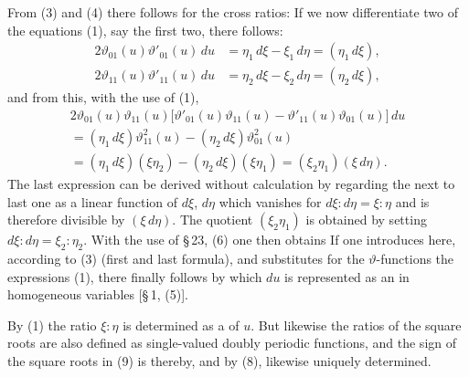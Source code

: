 
From (3) and (4) there follows for the cross ratios:
If we now differentiate two of the equations (1), say the first
two, there follows:
\[
\begin{aligned}
2\vartheta_{01}(u)\vartheta'_{01}(u)\,du &= \eta_1\,d\xi - \xi_1\,d\eta = (\eta_1\,d\xi),\\
2\vartheta_{11}(u)\vartheta'_{11}(u)\,du &= \eta_2\,d\xi - \xi_2\,d\eta = (\eta_2\,d\xi),
\end{aligned}
\]
and from this, with the use of (1),
\[
\begin{aligned}
2\vartheta_{01}(u)\vartheta_{11}(u)\bigl[\vartheta'_{01}(u)\vartheta_{11}(u) - \vartheta'_{11}(u)\vartheta_{01}(u)\bigr]\,du \\
= (\eta_1\,d\xi)\vartheta^2_{11}(u) - (\eta_2\,d\xi)\vartheta^2_{01}(u) \\
= (\eta_1\,d\xi)(\xi\eta_2) - (\eta_2\,d\xi)(\xi\eta_1) = (\xi_2\eta_1)(\xi\,d\eta).
\end{aligned}
\]
The last expression can be derived without calculation by regarding the
next to last one as a linear function of \(d\xi\), \(d\eta\) which vanishes for
\(d\xi : d\eta = \xi : \eta\) and is therefore divisible by \((\xi\,d\eta)\). The
quotient \((\xi_2\eta_1)\) is obtained by setting \(d\xi : d\eta = \xi_2 : \eta_2\). With
the use of \S\,23, (6) one then obtains
If one introduces here, according to (3) (first and last formula),
and substitutes for the \(\vartheta\)-functions the expressions (1), there
finally follows
by which \(du\) is represented as an 
in homogeneous variables [\S\,1, (5)].

By (1) the ratio \(\xi : \eta\) is determined as a 
of \(u\). But likewise the ratios of the square roots
are also defined as single-valued doubly periodic functions, and the sign
of the square roots in (9) is thereby, and by (8), likewise uniquely
determined.
